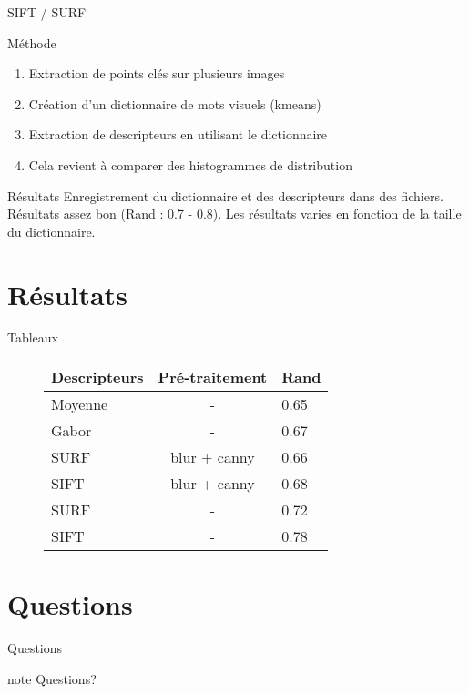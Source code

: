 \documentclass[xcolor=table]{beamer}
\begin{document}
	\begin{frame}{SIFT / SURF}
		\begin{block}{Méthode}
			\begin{enumerate}
				\item Extraction de points clés sur plusieurs images
				\item Création d'un dictionnaire de mots visuels (kmeans)
				\item Extraction de descripteurs en utilisant le dictionnaire
				\item Cela revient à comparer des histogrammes de distribution
			\end{enumerate}
		\end{block}
		\begin{block}{Résultats}
			Enregistrement du dictionnaire et des descripteurs dans des fichiers.\\
			Résultats assez bon (Rand : 0.7 - 0.8). Les résultats varies en fonction de la taille du dictionnaire.
		\end{block}
	\end{frame}


\section{Résultats}

	\begin{frame}{Tableaux}
		\begin{figure}[!h]
			\centering
			\begin{tabular}{ | l | c | l | }
				\hline
				Descripteurs & Pré-traitement & Rand \\
				\hline
					Moyenne &	-			 & 0.65\\
					Gabor	&	-			 & 0.67\\
					SURF 	& 	blur + canny & 0.66\\
					SIFT 	&	blur + canny & 0.68\\
					SURF 	& 	- 			 & 0.72\\
					SIFT 	&	-			 & 0.78\\
				\hline  
			\end{tabular}
		\end{figure}
	\end{frame}

	\section{Questions}
	\begin{frame}{Questions}
	    \begin{beamercolorbox}[center,shadow=true,rounded=true,]{note} 
	        \huge{Questions?}
	    \end{beamercolorbox} 
	\end{frame} 
\end{document}

